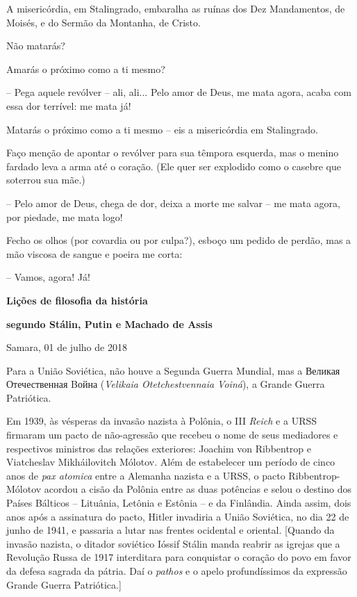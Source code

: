 A misericórdia, em Stalingrado, embaralha as ruínas dos Dez Mandamentos,
de Moisés, e do Sermão da Montanha, de Cristo.

Não matarás?

Amarás o próximo como a ti mesmo?

-- Pega aquele revólver -- ali, ali... Pelo amor de Deus, me mata agora,
acaba com essa dor terrível: me mata já!

Matarás o próximo como a ti mesmo -- eis a misericórdia em Stalingrado.

Faço menção de apontar o revólver para sua têmpora esquerda, mas o
menino fardado leva a arma até o coração. (Ele quer ser explodido como o
casebre que soterrou sua mãe.)

-- Pelo amor de Deus, chega de dor, deixa a morte me salvar -- me mata
agora, por piedade, me mata logo!

Fecho os olhos (por covardia ou por culpa?), esboço um pedido de perdão,
mas a mão viscosa de sangue e poeira me corta:

-- Vamos, agora! Já!

\textbf{Lições de filosofia da história }

\textbf{segundo Stálin, Putin e Machado de Assis}

Samara, 01 de julho de 2018

Para a União Soviética, não houve a Segunda Guerra Mundial, mas a
Великая Отечественная Bойна (\emph{Velikaia Otetchestvennaia Voiná}), a
Grande Guerra Patriótica.

Em 1939, às vésperas da invasão nazista à Polônia, o III \emph{Reich} e
a URSS firmaram um pacto de não-agressão que recebeu o nome de seus
mediadores e respectivos ministros das relações exteriores: Joachim von
Ribbentrop e Viatcheslav Mikháilovitch Mólotov. Além de estabelecer um
período de cinco anos de \emph{pax atomica} entre a Alemanha nazista e a
URSS, o pacto Ribbentrop-Mólotov acordou a cisão da Polônia entre as
duas potências e selou o destino dos Países Bálticos -- Lituânia,
Letônia e Estônia -- e da Finlândia. Ainda assim, dois anos após a
assinatura do pacto, Hitler invadiria a União Soviética, no dia 22 de
junho de 1941, e passaria a lutar nas frentes ocidental e oriental.
{[}Quando da invasão nazista, o ditador soviético Ióssif Stálin manda
reabrir as igrejas que a Revolução Russa de 1917 interditara para
conquistar o coração do povo em favor da defesa sagrada da pátria. Daí o
\emph{pathos} e o apelo profundíssimos da expressão Grande Guerra
Patriótica.{]}

